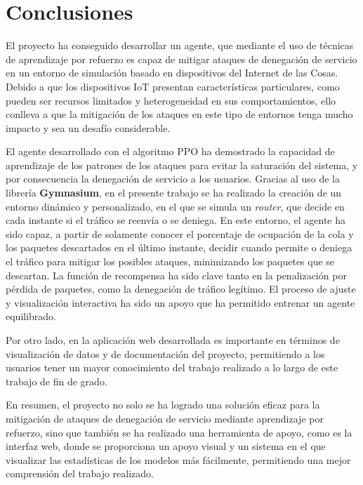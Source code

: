 
\section{Conclusiones}
El proyecto ha conseguido desarrollar un agente, que mediante el uso de técnicas de aprendizaje por refuerzo es capaz de mitigar ataques de denegación de servicio en un entorno de simulación basado en dispositivos  del Internet de las Cosas. Debido a que los dispositivos IoT presentan características particulares, como pueden ser recursos limitados y heterogeneidad en sus comportamientos, ello conlleva a que la mitigación de los ataques en este tipo de entornos tenga mucho impacto y sea un desafío considerable.

El agente desarrollado con el algoritmo PPO ha demostrado la capacidad de aprendizaje de los patrones de los ataques para evitar la saturación del sistema, y por consecuencia la denegación de servicio a los usuarios. Gracias al uso de la librería \textbf{Gymnasium}, en el presente trabajo se ha realizado la creación de un entorno dinámico y personalizado, en el que se simula un \textit{router}, que decide en cada instante si el tráfico se reenvía o se deniega. 
En este entorno, el agente ha sido capaz, a partir de solamente conocer el porcentaje de ocupación de la cola y los paquetes descartados en el último instante, decidir cuando permite o deniega el tráfico para mitigar los posibles ataques, minimizando los paquetes que se descartan. 
La función de recompensa ha sido clave tanto en la penalización por pérdida de paquetes, como la denegación de tráfico legítimo. El proceso de ajuste y visualización interactiva ha sido un apoyo que ha permitido entrenar un agente equilibrado.

Por otro lado, en la aplicación web desarrollada es importante en términos de visualización de datos y de documentación del proyecto, permitiendo a los usuarios tener un mayor conocimiento del trabajo realizado a lo largo de este trabajo de fin de grado.

En resumen, el proyecto no solo se ha logrado una solución eficaz para la mitigación de ataques de denegación de servicio mediante aprendizaje por refuerzo, sino que también se ha realizado una herramienta de apoyo, como es la interfaz web, donde se proporciona un apoyo visual y un sistema en el que visualizar las estadísticas de los modelos más fácilmente, permitiendo una mejor comprensión del trabajo realizado.

